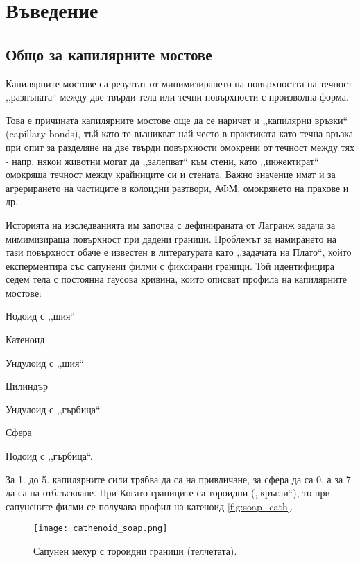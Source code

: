 \section{Въведение}
\subsection{Общо за капилярните мостове}
Капилярните мостове са резултат от минимизирането на повърхността на течност
,,разпъната`` между две твърди тела или течни повърхности с произволна форма.

Това е причината капилярните мостове още да се наричат и ,,капилярни връзки`` (capillary bonds),
тъй като те възникват най-често в практиката като течна връзка при опит за разделяне на две
твърди повърхности омокрени от течност между тях - напр. някои животни могат да ,,залепват`` към
стени, като ,,инжектират`` омокряща течност между \cite{Persson_2007} крайниците си и стената.
Важно значение имат и за агрерирането на частиците в колоидни разтвори, АФМ, омокрянето на прахове и др.

Историята на изследванията им започва с дефинираната от Лагранж задача за мимимизираща повърхност
при дадени граници. Проблемът за намирането на тази повърхност обаче е известен в литературата
като ,,задачата на Плато``, който експерментира със сапунени филми с фиксирани граници.
Той идентифицира седем тела с постоянна гаусова кривина, които описват профила на капилярните мостове:
\begin{enumerate*}
    \item Нодоид с ,,шия``
    \item Катеноид
    \item Ундулоид с ,,шия``
    \item Цилиндър
    \item Ундулоид с ,,гърбица``
    \item Сфера
    \item Нодоид с ,,гърбица``.
\end{enumerate*}
За 1. до 5. капилярните сили трябва да са на привличане, за сфера да са 0, а за 7. да са на
отблъскване. При \cite{Kralchevsky}
Когато границите са тороидни (,,кръгли``), то при сапунените филми се получава профил на катеноид \autoref{fig:soap_cath}.
\begin{figure}[h]
    \centering
    \texttt{[image: cathenoid\_soap.png]}
    \caption{Сапунен мехур с тороидни граници (телчетата).\cite{Soap_cathenoid}}
    \label{fig:soap_cath}
\end{figure}

